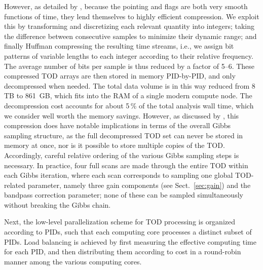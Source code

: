 \documentclass[twocolumn]{aa}
\begin{document}
However, as detailed by \citet{bp03}, because the pointing and flags
are both very smooth functions of time, they lend themselves to highly
efficient compression. We exploit this by transforming and
discretizing each relevant quantity into integers; taking the
difference between consecutive samples to minimize their dynamic
range; and finally Huffman compressing \citep{huffman:1952} the
resulting time streams, i.e., we assign bit patterns of variable
lengths to each integer according to their relative frequency. The
average number of bits per sample is thus reduced by a factor of
5--6. These compressed TOD arrays are then stored in memory
PID-by-PID, and only decompressed when needed. The total data volume
is in this way reduced from 8\,TB to 861~GB, which fits into the RAM
of a single modern compute node. The decompression cost accounts for
about 5\,\% of the total analysis wall time, which we consider well
worth the memory savings. However, as discussed by \citet{bp03}, this
compression does have notable implications in terms of the overall
Gibbs sampling structure, as the full decompressed TOD set can never
be stored in memory at once, nor is it possible to store multiple
copies of the TOD. Accordingly, careful relative ordering of the
various Gibbs sampling steps is necessary. In practice, four full
scans are made through the entire TOD within each Gibbs iteration,
where each scan corresponds to sampling one global TOD-related
parameter, namely three gain components (see
Sect.~\ref{sec:gain}) and the bandpass correction parameter; none of
these can be sampled simultaneously without breaking the Gibbs chain.

Next, the low-level parallelization scheme for TOD processing is
organized according to PIDs, such that each computing core processes a
distinct subset of PIDs. Load balancing is achieved by first measuring
the effective computing time for each PID, and then distributing them
according to cost in a round-robin manner among the various computing
cores.
\end{document}
